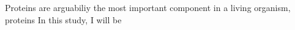 Proteins are arguabiliy the most important component in a living organism, proteins   In this study, I will be 